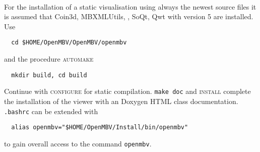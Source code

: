 \paragraph{\OpenMBV{}}
For the installation of a static visualisation using always the newest source files it is assumed that Coin3d, MBXMLUtils, \HDFSerie, SoQt, Qwt with version 5 are installed. Use
\begin{verbatim}
  cd $HOME/OpenMBV/OpenMBV/openmbv
\end{verbatim} 
and the procedure \textsc{automake}
\begin{verbatim}
  mkdir build, cd build
\end{verbatim}
Continue with \textsc{configure} for static compilation. \texttt{make doc} and \textsc{install} complete the installation of the viewer with an Doxygen HTML class documentation. \texttt{.bashrc} can be extended with
\begin{verbatim}
  alias openmbv="$HOME/OpenMBV/Install/bin/openmbv"
\end{verbatim}
to gain overall access to the command \texttt{openmbv}.

